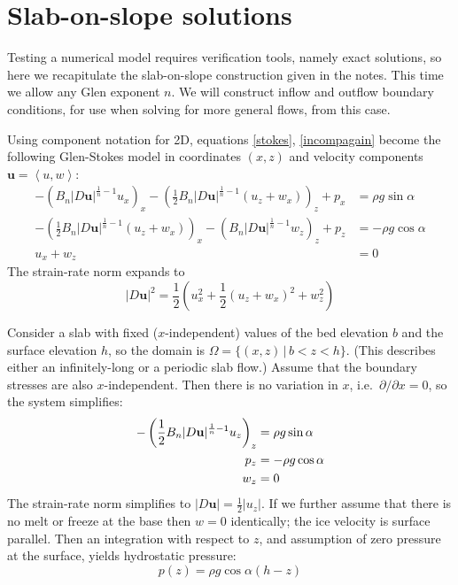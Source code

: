 \documentclass[letterpaper,final,12pt,reqno]{amsart}
\newcommand{\bu}{\mathbf{u}}
\begin{document}
\section{Slab-on-slope solutions}  \label{sec:slab}

Testing a numerical model requires verification tools, namely exact solutions, so here we recapitulate the slab-on-slope construction given in the notes.  This time we allow any Glen exponent $n$.  We will construct inflow and outflow boundary conditions, for use when solving for more general flows, from this case.

Using component notation for 2D, equations \eqref{stokes}, \eqref{incompagain} become the following Glen-Stokes model in coordinates $(x,z)$ and velocity components $\bu=\left<u,w\right>$:
\begin{align}
- \left(B_n |D\bu|^{\frac{1}{n}-1} u_x\right)_x - \left(\frac{1}{2} B_n |D\bu|^{\frac{1}{n}-1} \left(u_z+w_x\right)\right)_z + p_x &= \rho g\sin\alpha \label{planestressx} \\
- \left(\frac{1}{2} B_n |D\bu|^{\frac{1}{n}-1} \left(u_z+w_x\right)\right)_x - \left(B_n |D\bu|^{\frac{1}{n}-1} w_z\right)_z + p_z &= -\rho g\cos\alpha \label{planestressz} \\
u_x + w_z &= 0 \label{planeincomp}
\end{align}
The strain-rate norm expands to
\begin{equation}
    |D\bu|^2 = \frac{1}{2} \left(u_x^2 + \frac{1}{2}(u_z+w_x)^2 + w_z^2\right)  \label{planeDnorm}
\end{equation}

Consider a slab with fixed ($x$-independent) values of the bed elevation $b$ and the surface elevation $h$, so the domain is $\Omega = \{(x,z)\,|\,b < z < h\}$.  (This describes either an infinitely-long or a periodic slab flow.)  Assume that the boundary stresses are also $x$-independent.  Then there is no variation in $x$, i.e.~$\partial/\partial x=0$, so the system simplifies:
\begin{align}
- \left(\frac{1}{2}B_n |D\bu|^{\frac{1}{n}-1} u_z\right)_z &= \rho g\sin\alpha \label{slabstresses} \\
p_z &= -\rho g\cos\alpha \notag \\
w_z &= 0 \notag
\end{align}
The strain-rate norm simplifies to $|D\bu| = \frac{1}{2} |u_z|$.  If we further assume that there is no melt or freeze at the base then $w=0$ identically; the ice velocity is surface parallel.  Then an integration with respect to $z$, and assumption of zero pressure at the surface, yields hydrostatic pressure:
\begin{equation}
p(z) = \rho g\cos\alpha (h-z)  \label{pslab}
\end{equation}
\end{document}
